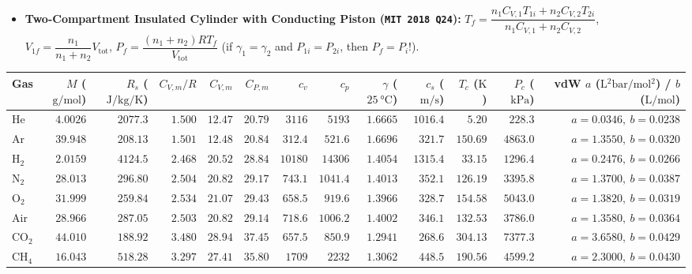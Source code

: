 \documentclass[10pt,twoside,openany,letterpaper]{book}
\begin{document}
\begin{quicksheet}
\begin{formulacard}
\begin{itemize}
\begin{itemize}
  \end{itemize}
  \item \textbf{Two-Compartment Insulated Cylinder with Conducting Piston (\texttt{MIT 2018 Q24}):} $T_f = \dfrac{n_1 C_{V,1}T_{1i} + n_2 C_{V,2}T_{2i}}{n_1 C_{V,1} + n_2 C_{V,2}}$, $V_{1f} = \dfrac{n_1}{n_1+n_2}V_{\mathrm{tot}}$, $P_f = \dfrac{(n_1+n_2)RT_f}{V_{\mathrm{tot}}}$ (if $\gamma_1 = \gamma_2$ and $P_{1i}=P_{2i}$, then $P_f = P_i$!).
\end{itemize}
\par\smallskip\noindent
\scriptsize\setlength{\tabcolsep}{3.0pt}\renewcommand{\arraystretch}{1.06}
\begin{tabularx}{\linewidth}{@{}l r r r r r r r r r r r r@{}}
\toprule
\textbf{Gas} & $M$ ($\si{\gram\per\mole}$) & $R_s$ ($\si{\joule\per\kilogram\per\kelvin}$) & $C_{V,m}/R$ & $C_{V,m}$ & $C_{P,m}$ & $c_v$ & $c_p$ & $\gamma$ ($\SI{25}{\celsius}$) & $c_s$ ($\si{\meter\per\second}$) & $T_c$ ($\si{\kelvin}$) & $P_c$ ($\si{\kilo\pascal}$) & vdW $a$ ($\si{\liter^2\bar\per\mole^2}$) / $b$ ($\si{\liter\per\mole}$) \\
\midrule
$\mathrm{He}$ & $4.0026$ & $2077.3$ & $1.500$ & $12.47$ & $20.79$ & $3116$ & $5193$ & $1.6665$ & $1016.4$ & $5.20$ & $228.3$ & $a=0.0346,\ b=0.0238$ \\
$\mathrm{Ar}$ & $39.948$ & $208.13$ & $1.501$ & $12.48$ & $20.84$ & $312.4$ & $521.6$ & $1.6696$ & $321.7$ & $150.69$ & $4863.0$ & $a=1.3550,\ b=0.0320$ \\
$\mathrm{H_2}$ & $2.0159$ & $4124.5$ & $2.468$ & $20.52$ & $28.84$ & $10180$ & $14306$ & $1.4054$ & $1315.4$ & $33.15$ & $1296.4$ & $a=0.2476,\ b=0.0266$ \\
$\mathrm{N_2}$ & $28.013$ & $296.80$ & $2.504$ & $20.82$ & $29.17$ & $743.1$ & $1041.4$ & $1.4013$ & $352.1$ & $126.19$ & $3395.8$ & $a=1.3700,\ b=0.0387$ \\
$\mathrm{O_2}$ & $31.999$ & $259.84$ & $2.534$ & $21.07$ & $29.43$ & $658.5$ & $919.6$ & $1.3966$ & $328.7$ & $154.58$ & $5043.0$ & $a=1.3820,\ b=0.0319$ \\
$\mathrm{Air}$ & $28.966$ & $287.05$ & $2.503$ & $20.82$ & $29.14$ & $718.6$ & $1006.2$ & $1.4002$ & $346.1$ & $132.53$ & $3786.0$ & $a=1.3580,\ b=0.0364$ \\
$\mathrm{CO_2}$ & $44.010$ & $188.92$ & $\mathbf{3.480}$ & $28.94$ & $37.45$ & $657.5$ & $850.9$ & $1.2941$ & $268.6$ & $304.13$ & $7377.3$ & $a=3.6580,\ b=0.0429$ \\
$\mathrm{CH_4}$ & $16.043$ & $518.28$ & $3.297$ & $27.41$ & $35.80$ & $1709$ & $2232$ & $1.3062$ & $448.5$ & $190.56$ & $4599.2$ & $a=2.3000,\ b=0.0430$ \\

\end{tabularx}
\end{formulacard}
\end{quicksheet}
\end{document}
